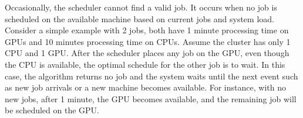 Occasionally, the scheduler cannot find a valid job. It occurs when no job is scheduled on the available machine based on current jobs and system load. Consider a simple example with 2 jobs, both have 1 minute processing time on GPUs and 10 minutes processing time on CPUs. Assume the cluster has only 1 CPU and 1 GPU. After the scheduler places any job on the GPU, even though the CPU is available, the optimal schedule for the other job is to wait. In this case, the algorithm returns no job and the system waits until the next event such as new job arrivals or a new machine becomes available. For instance, with no new jobs, after 1 minute, the GPU becomes available, and the remaining job will be scheduled on the GPU.




